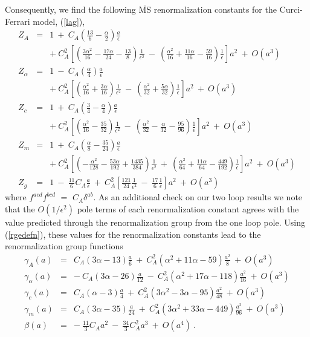 \documentclass[a4paper,11pt]{article}
\newcommand{\MSbar}{\overline{\mbox{MS}}}
\begin{document}
Consequently, we find the following $\MSbar$ renormalization constants for the 
Curci-Ferrari model, (\ref{lag}),  
\begin{eqnarray} 
Z_A &=& 1 ~+~ C_A \left( \frac{13}{6} - \frac{\alpha}{2} \right) 
\frac{a}{\epsilon} \nonumber \\
&& +~ C_A^2 \left[ \left( \frac{3\alpha^2}{16} - \frac{17\alpha}{24} 
- \frac{13}{8} \right) \frac{1}{\epsilon^2} ~-~ \left( \frac{\alpha^2}{16} 
+ \frac{11\alpha}{16} - \frac{59}{16} \right) \frac{1}{\epsilon} 
\right] a^2 ~+~ O(a^3) \nonumber \\ 
Z_\alpha &=& 1 ~-~ C_A \left( \frac{\alpha}{4} \right) 
\frac{a}{\epsilon} \nonumber \\
&& +~ C_A^2 \left[ \left( \frac{\alpha^2}{16} + \frac{3\alpha}{16} 
\right) \frac{1}{\epsilon^2} ~-~ \left( \frac{\alpha^2}{32} 
+ \frac{5\alpha}{32} \right) \frac{1}{\epsilon} \right] a^2 ~+~ O(a^3) 
\nonumber \\ 
Z_c &=& 1 ~+~ C_A \left( \frac{3}{4} - \frac{\alpha}{4} \right) 
\frac{a}{\epsilon} \nonumber \\
&& +~ C_A^2 \left[ \left( \frac{\alpha^2}{16} - \frac{35}{32} \right) 
\frac{1}{\epsilon^2} ~-~ \left( \frac{\alpha^2}{32} - \frac{\alpha}{32} 
- \frac{95}{96} \right) \frac{1}{\epsilon} \right] a^2 ~+~ O(a^3) \nonumber \\ 
Z_m &=& 1 ~+~ C_A \left( \frac{\alpha}{8} - \frac{35}{24} \right) 
\frac{a}{\epsilon} \nonumber \\
&& +~ C_A^2 \left[ \left( - \frac{\alpha^2}{128} - \frac{53\alpha}{192} 
+ \frac{1435}{384} \right) \frac{1}{\epsilon^2} ~+~ 
\left( \frac{\alpha^2}{64} + \frac{11\alpha}{64} - \frac{449}{192} \right) 
\frac{1}{\epsilon} \right] a^2 ~+~ O(a^3) \nonumber \\ 
Z_g &=& 1 ~-~ \frac{11}{6} C_A \frac{a}{\epsilon} ~+~ C_A^2 \left[ 
\frac{121}{24} \frac{1}{\epsilon^2} ~-~ \frac{17}{6} \frac{1}{\epsilon} \right]
a^2 ~+~ O(a^3) 
\end{eqnarray}  
where $f^{acd} f^{bcd}$ $=$ $C_A \delta^{ab}$. As an additional check on our 
two loop results we note that the $O(1/\epsilon^2)$ pole terms of each 
renormalization constant agrees with the value predicted through the 
renormalization group from the one loop pole. Using (\ref{rgedefn}), these 
values for the renormalization constants lead to the renormalization group 
functions 
\begin{eqnarray} 
\gamma_A(a) &=& C_A ( 3\alpha - 13 ) \frac{a}{6} ~+~ C_A^2 \left(
\alpha^2 + 11\alpha - 59 \right) \frac{a^2}{8} ~+~ O(a^3) \nonumber \\  
\gamma_\alpha(a) &=& -~ C_A ( 3\alpha - 26 ) \frac{a}{12} ~-~ 
C_A^2 \left( \alpha^2 + 17\alpha - 118 \right) \frac{a^2}{16} ~+~ O(a^3) 
\nonumber \\ 
\gamma_c(a) &=& C_A ( \alpha - 3 ) \frac{a}{4} ~+~ C_A^2 \left(
3\alpha^2 - 3\alpha - 95 \right) \frac{a^2}{48} ~+~ O(a^3) \nonumber \\  
\gamma_m(a) &=& C_A ( 3\alpha - 35 ) \frac{a}{24} ~+~ C_A^2 \left(
3\alpha^2 + 33\alpha - 449 \right) \frac{a^2}{96} ~+~ O(a^3) \nonumber \\
\beta(a) &=& -~ \frac{11}{3} C_A a^2 ~-~ \frac{34}{3} C_A^2 a^3 ~+~ O(a^4) ~.  
\end{eqnarray} 
\end{document}
